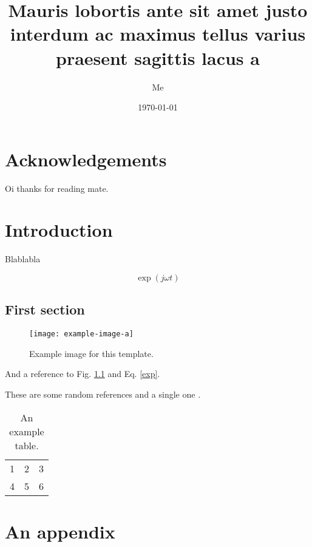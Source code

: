 \documentclass{cpa-thesis}
\title{Mauris lobortis ante sit amet justo interdum ac maximus tellus varius praesent sagittis lacus a}
\author{Me}
\date{\today}
\begin{document}

    \maketitle

    \chapter*{Acknowledgements}

    Oi thanks for reading mate.

    \tableofcontents

    \listoffigures

    \listoftables
    

    \chapter{Introduction}

    Blablabla

    \blindtext[5]

    \begin{equation}
        \exp{(j \omega t)}  \label{exp} 
    \end{equation}

    \section{First section}

    \begin{figure}
        \centering
        \texttt{[image: example-image-a]}
        \caption[Example image]{Example image for this template.}
        \label{example-fig}
    \end{figure}

    \blindtext[5] And a reference to Fig. \ref{example-fig} and Eq. \ref{exp}. 

    These are some random references \cite{einstein,knuth-fa,dirac} and a single one \cite{knuth-fa}.

    \begin{table}
        \centering
        \begin{tabular}{ccc}
            1 & 2 & 3 \\
            4 & 5 & 6 \\
            \hline
        \end{tabular}
        \caption[A table]{An example table.}
        \label{example-table}
    \end{table}

    \appendix

    \chapter{An appendix}

    \blindtext

    \printbibliography
\end{document}
